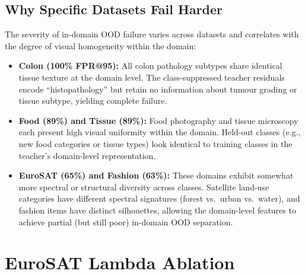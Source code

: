 \documentclass[runningheads]{llncs}
\begin{document}
\begin{table}[h]
  \centering
  \caption{MDS Teacher Only: per-dataset FPR@95 (\%) on frozen DINOv2 features.
  The teacher achieves near-perfect out-of-domain OOD detection but fails catastrophically
  on in-domain OOD, confirming the orthogonality of domain-shift and class-boundary signals.}
  \label{tab:supp:teacher-oracle}
  \small
  \setlength{\tabcolsep}{5pt}
  \resizebox{\linewidth}{!}{}
\end{table}

\subsection{Why Specific Datasets Fail Harder}

The severity of in-domain OOD failure varies across datasets and correlates with the
degree of visual homogeneity within the domain:

\begin{itemize}
  \item \textbf{Colon (100\% FPR@95):} All colon pathology subtypes share identical
  tissue texture at the domain level. The class-suppressed teacher residuals encode
  ``histopathology'' but retain no information about tumour grading or tissue subtype,
  yielding complete failure.

  \item \textbf{Food (89\%) and Tissue (89\%):} Food photography and tissue microscopy
  each present high visual uniformity within the domain. Held-out classes (e.g., new food
  categories or tissue types) look identical to training classes in the teacher's
  domain-level representation.

  \item \textbf{EuroSAT (65\%) and Fashion (63\%):} These domains exhibit somewhat more
  spectral or structural diversity across classes. Satellite land-use categories have
  different spectral signatures (forest vs.\ urban vs.\ water), and fashion items have
  distinct silhouettes, allowing the domain-level features to achieve partial (but still
  poor) in-domain OOD separation.
\end{itemize}

\section{EuroSAT Lambda Ablation}
\label{sec:supp:eurosat-lambda-ablation}
\end{document}
